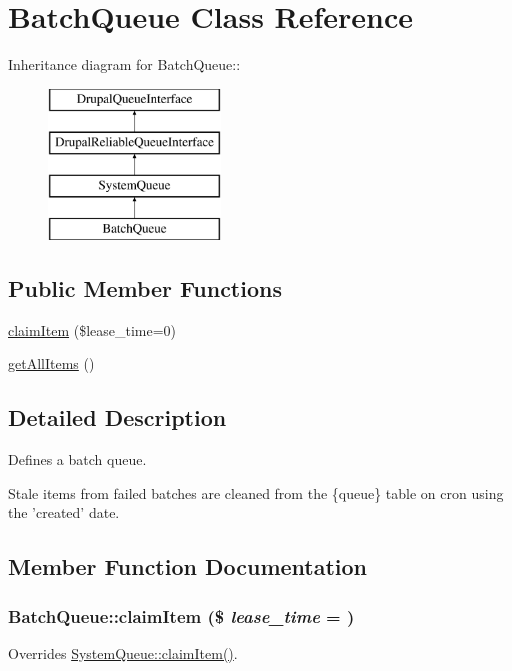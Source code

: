 \hypertarget{classBatchQueue}{
\section{BatchQueue Class Reference}
\label{classBatchQueue}
}
Inheritance diagram for BatchQueue::\begin{figure}[H]
\begin{center}
\leavevmode
\includegraphics[height=4cm]{classBatchQueue}
\end{center}
\end{figure}
\subsection*{Public Member Functions}
\begin{DoxyCompactItemize}
\item 
\hyperlink{classBatchQueue_a489fb34e9fe09e9434d81a3fba605d97}{claimItem} (\$lease\_\-time=0)
\item 
\hyperlink{classBatchQueue_ace0935cd7b32c943d32122a1ce277d6e}{getAllItems} ()
\end{DoxyCompactItemize}


\subsection{Detailed Description}
Defines a batch queue.

Stale items from failed batches are cleaned from the \{queue\} table on cron using the 'created' date. 

\subsection{Member Function Documentation}
\hypertarget{classBatchQueue_a489fb34e9fe09e9434d81a3fba605d97}{
\subsubsection[{claimItem}]{\setlength{\rightskip}{0pt plus 5cm}BatchQueue::claimItem (\$ {\em lease\_\-time} = {})}}
\label{classBatchQueue_a489fb34e9fe09e9434d81a3fba605d97}
Overrides \hyperlink{classSystemQueue_aa5f774d4ef4b31f1318751d9b9872071}{SystemQueue::claimItem()}.

